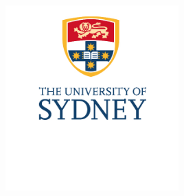 \begin{titlepage}

\includegraphics[width=0.5\textwidth]{Images/USYDlogo.jpg} %
 

\vfill %
\end{titlepage}